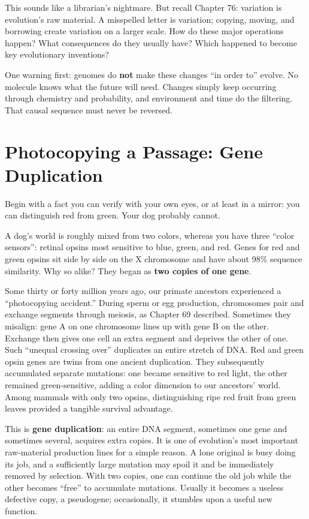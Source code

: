 This sounds like a librarian's nightmare. But recall Chapter 76: variation is evolution's raw material. A misspelled letter is variation; copying, moving, and borrowing create variation on a larger scale. How do these major operations happen? What consequences do they usually have? Which happened to become key evolutionary inventions?

One warning first: genomes do \textbf{not} make these changes ``in order to'' evolve. No molecule knows what the future will need. Changes simply keep occurring through chemistry and probability, and environment and time do the filtering. That causal sequence must never be reversed.

\section{Photocopying a Passage: Gene Duplication}

Begin with a fact you can verify with your own eyes, or at least in a mirror: you can distinguish red from green. Your dog probably cannot.

A dog's world is roughly mixed from two colors, whereas you have three ``color sensors'': retinal opsins most sensitive to blue, green, and red. Genes for red and green opsins sit side by side on the X chromosome and have about 98\% sequence similarity. Why so alike? They began as \textbf{two copies of one gene}.

Some thirty or forty million years ago, our primate ancestors experienced a ``photocopying accident.'' During sperm or egg production, chromosomes pair and exchange segments through meiosis, as Chapter 69 described. Sometimes they misalign: gene A on one chromosome lines up with gene B on the other. Exchange then gives one cell an extra segment and deprives the other of one. Such ``unequal crossing over'' duplicates an entire stretch of DNA. Red and green opsin genes are twins from one ancient duplication. They subsequently accumulated separate mutations: one became sensitive to red light, the other remained green-sensitive, adding a color dimension to our ancestors' world. Among mammals with only two opsins, distinguishing ripe red fruit from green leaves provided a tangible survival advantage.

This is \textbf{gene duplication}: an entire DNA segment, sometimes one gene and sometimes several, acquires extra copies. It is one of evolution's most important raw-material production lines for a simple reason. A lone original is busy doing its job, and a sufficiently large mutation may spoil it and be immediately removed by selection. With two copies, one can continue the old job while the other becomes ``free'' to accumulate mutations. Usually it becomes a useless defective copy, a pseudogene; occasionally, it stumbles upon a useful new function.

